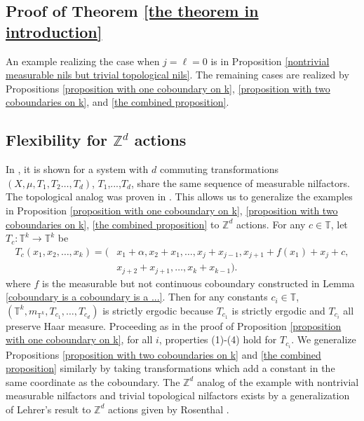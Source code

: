 \documentclass[12pt]{amsart}
\theoremstyle{definition}
\theoremstyle{plain}
\theoremstyle{definition}
\numberwithin{equation}{section}
\begin{document}
\subsection{Proof of Theorem \ref{the theorem in introduction}}


  An example realizing the case when $j=\ell=0$ is in Proposition \ref{nontrivial measurable nils but trivial topological nils}. The remaining cases are realized by Propositions \ref{proposition with one coboundary on k}, \ref{proposition with two coboundaries on k}, and \ref{the combined proposition}. 


\subsection{Flexibility for $\mathbb{Z}^{d}$ actions}

In \cite{Frantzikinakis and Kra}, it is shown for a system with $d$ commuting transformations $(X,\mu,T_1,T_2\dots,T_d)$, $T_1$,...,$T_d$, share the same sequence of measurable nilfactors. The topological analog was proven in \cite{Shao and Xu}. This allows us to generalize the examples in Proposition \ref{proposition with one coboundary on k}, \ref{proposition with two coboundaries on k}, \ref{the combined proposition} to $\mathbb{Z}^{d}$ actions. For any $c\in \mathbb{T}$, let $T_c\colon \mathbb{T}^{k}\rightarrow \mathbb{T}^{k}$ be
\begin{align*}
    T_c(x_1,x_2,\dots,x_{k})=\Big(&x_1+\alpha,x_2+x_1,\dots,x_{j}+x_{j-1},x_{j+1}+f(x_1)+x_{j}+c,\\
    &x_{j+2}+x_{j+1},\dots,x_{k}+x_{k-1}\Big).
  \end{align*} where $f$ is the measurable but not continuous coboundary constructed in Lemma \ref{coboundary is a coboundary is a ...}.
Then for any constants $c_i\in \mathbb{T}$, $(\mathbb{T}^{k},m_{\mathbb{T}^{k}},T_{c_1},\dots,T_{c_d})$ is strictly ergodic because $T_{c_1}$ is strictly ergodic and $T_{c_i}$ all preserve Haar measure. Proceeding as in the proof of Proposition \ref{proposition with one coboundary on k}, for all $i$, properties (1)-(4) hold for $T_{c_i}$. We generalize Propositions \ref{proposition with two coboundaries on k} and \ref{the combined proposition} similarly by taking transformations which add a constant in the same coordinate as the coboundary. The $\mathbb{Z}^{d}$ analog of the example with nontrivial measurable nilfactors and trivial topological nilfactors exists by a generalization of Lehrer's result \cite{Lehrer} to $\mathbb{Z}^{d}$ actions given by Rosenthal \cite{Rosenthal}.
\end{document}
